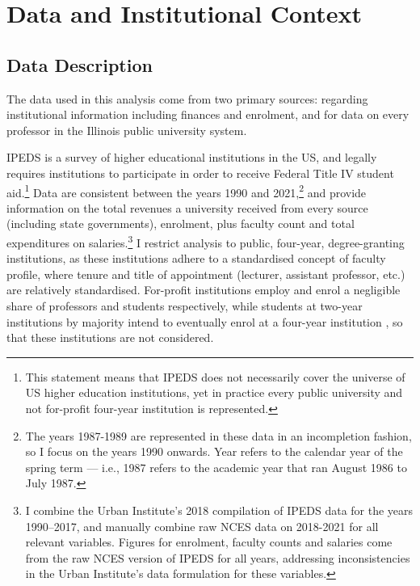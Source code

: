 \section{Data and Institutional Context}
\label{sec:data}

\subsection{Data Description}
The data used in this analysis come from two primary sources: \citet[IPEDS]{ipeds} regarding institutional information including finances and enrolment, and \citet[IBHED]{ibhed} for data on every professor in the Illinois public university system.

IPEDS is a survey of higher educational institutions in the US, and legally requires institutions to participate in order to receive Federal Title IV student aid.\footnote{
    This statement means that IPEDS does not necessarily cover the universe of US higher education institutions, yet in practice every public university and not for-profit four-year institution is represented.
}
Data are consistent between the years 1990 and 2021,\footnote{
    The years 1987-1989 are represented in these data in an incompletion fashion, so I focus on the years 1990 onwards.
    Year refers to the calendar year of the spring term --- i.e., 1987 refers to the academic year that ran August 1986 to July 1987.
}
and provide information on the total revenues a university received from every source (including state governments), enrolment, plus faculty count and total expenditures on salaries.\footnote{
    I combine the Urban Institute's 2018 compilation of IPEDS data for the years 1990--2017, and manually combine raw NCES data on 2018-2021 for all relevant variables.
    Figures for enrolment, faculty counts and salaries come from the raw NCES version of IPEDS for all years, addressing inconsistencies in the Urban Institute's data formulation for these variables.
}
I restrict analysis to public, four-year, degree-granting institutions, as these institutions adhere to a standardised concept of faculty profile, where tenure and title of appointment (lecturer, assistant professor, etc.) are relatively standardised.
For-profit institutions employ and enrol a negligible share of professors and students respectively, while students at two-year institutions by majority intend to eventually enrol at a four-year institution \citep{mountjoy2022}, so that these institutions are not considered.

